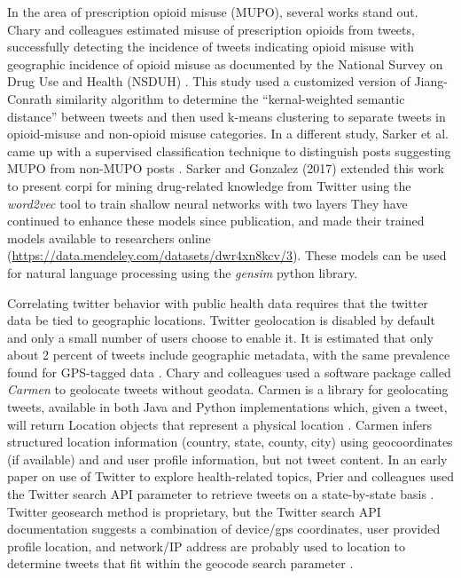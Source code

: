 \documentclass[sigconf]{acmart}
\begin{document}
In the area of prescription opioid misuse (MUPO), several works stand out. 
Chary and colleagues estimated misuse of prescription opioids from tweets, 
successfully detecting the incidence of tweets indicating opioid misuse with 
geographic incidence of opioid misuse as documented by the National Survey 
on Drug Use and Health (NSDUH) \cite{chary17}. This study used a customized 
version of Jiang-Conrath similarity algorithm \cite{jiang97} to determine the 
``kernal-weighted semantic distance'' between tweets and then used k-means 
clustering to separate tweets in opioid-misuse and non-opioid misuse 
categories. In a different study, Sarker et al. came up with a supervised 
classification technique to distinguish posts suggesting MUPO from non-MUPO 
posts \cite{sarker15}. Sarker and Gonzalez (2017) extended this work to present 
corpi for mining drug-related knowledge from Twitter using the \emph{word2vec} 
tool to train shallow neural networks with two layers \cite{sarker17} They have 
continued to enhance these models since publication, and made their trained 
models available to researchers online 
(\url{https://data.mendeley.com/datasets/dwr4xn8kcv/3}). 
These models can be used for natural language processing using the 
\emph{gensim} python library.


Correlating twitter behavior with public health data requires that the twitter 
data be tied to geographic locations. Twitter geolocation is disabled by 
default and only a small number of users choose to enable it. It is estimated 
that only about 2 percent of tweets include geographic metadata, with the 
same prevalence found for GPS-tagged data \cite{chary17, leetaru13}. 
Chary and colleagues used a software package called \emph{Carmen} to geolocate 
tweets without geodata. Carmen is a library for geolocating tweets, available 
in both Java and Python implementations which, given a tweet, will return 
Location objects that represent a physical location \cite{dredze13}. Carmen 
infers structured location information (country, state, county, city) using 
geocoordinates (if available) and and user profile information, but not tweet 
content. In an early paper on use of Twitter to explore health-related topics, 
Prier and colleagues used the Twitter search API parameter to retrieve tweets 
on a state-by-state basis \cite{prier11}. Twitter geosearch method is 
proprietary, but the Twitter search API documentation suggests a combination 
of device/gps coordinates, user provided profile location, and network/IP 
address are probably used to location to determine tweets that fit within 
the geocode search parameter \cite{twitterGet}.
\end{document}
